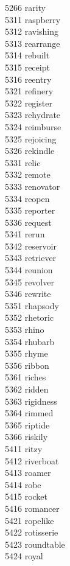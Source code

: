 5266 rarity \\
5311 raspberry \\
5312 ravishing \\
5313 rearrange \\
5314 rebuilt \\
5315 receipt \\
5316 reentry \\
5321 refinery \\
5322 register \\
5323 rehydrate \\
5324 reimburse \\
5325 rejoicing \\
5326 rekindle \\
5331 relic \\
5332 remote \\
5333 renovator \\
5334 reopen \\
5335 reporter \\
5336 request \\
5341 rerun \\
5342 reservoir \\
5343 retriever \\
5344 reunion \\
5345 revolver \\
5346 rewrite \\
5351 rhapsody \\
5352 rhetoric \\
5353 rhino \\
5354 rhubarb \\
5355 rhyme \\
5356 ribbon \\
5361 riches \\
5362 ridden \\
5363 rigidness \\
5364 rimmed \\
5365 riptide \\
5366 riskily \\
5411 ritzy \\
5412 riverboat \\
5413 roamer \\
5414 robe \\
5415 rocket \\
5416 romancer \\
5421 ropelike \\
5422 rotisserie \\
5423 roundtable \\
5424 royal \\

